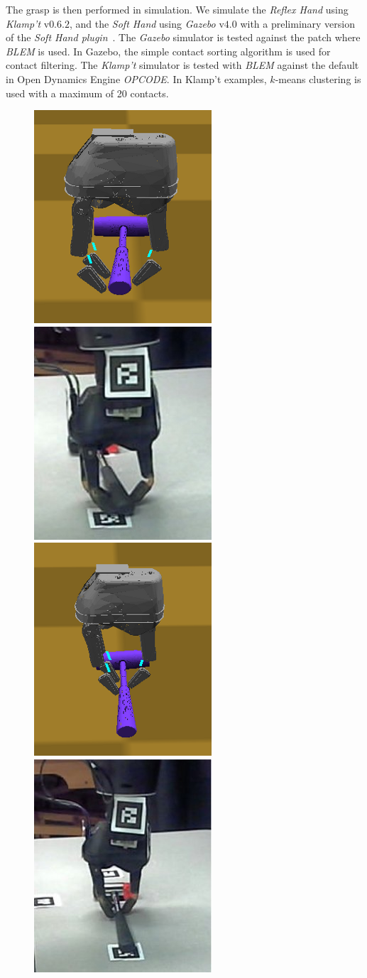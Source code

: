 The grasp is then performed in simulation.
We simulate the \emph{Reflex Hand} using \emph{Klamp't} v$0.6.2$, and the \emph{Soft Hand} using \emph{Gazebo} v$4.0$ with a preliminary version of the \emph{Soft Hand plugin}~\cite{Rosales15SHP}.
The \emph{Gazebo} simulator is tested against the patch \cite{Rocchi15GBP} where \emph{BLEM} is used. In Gazebo, the simple contact sorting algorithm is used for contact filtering. The \emph{Klamp't} simulator is tested with  \emph{BLEM} against the default in Open Dynamics Engine \emph{OPCODE}.  In Klamp't examples, $k$-means clustering is used with a maximum of 20 contacts.



\begin{figure}[!!hbt]
\begin{center}
{ \includegraphics[width=0.30\columnwidth]     {images/ssoch/fig/hammer_P1}    \label{hammer_P1}}
{ \includegraphics[width=0.30\columnwidth]     {images/ssoch/fig/hammer_p1_1}    \label{hammer_p1_1}}
{ \includegraphics[width=0.30\columnwidth]     {images/ssoch/fig/hammer_P2}    \label{hammer_P2}}
{ \includegraphics[width=0.30\columnwidth]     {images/ssoch/fig/hammer_p2_1}    \label{hammer_p2_1}}

\end{center}
\end{figure}

